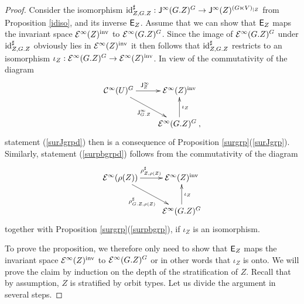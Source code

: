 \begin{proof} 
Consider the isomorphism 
$\operatorname{id}^{\sharp}_{Z,G.Z}:\mathsf{J}^\infty (G.Z)^G \rightarrow \mathsf{J}^\infty (Z)^{(G \ltimes V)_{|Z}}$ 
from Proposition \ref{idiso}, and its inverse $\mathsf{E}_Z$. Assume that we can show that                  
$\mathsf{E}_Z$ maps the invariant space $\mathcal{E}^\infty (Z)^\textup{inv}$ to $\mathcal{E}^\infty (G.Z)^G$. 
Since the image of 
$\mathcal{E}^\infty (G.Z)^G$ under $\operatorname{id}^{\sharp}_{Z,G.Z}$ obviously lies in $\mathcal{E}^\infty (Z)^\textup{inv}$
it then follows that $\operatorname{id}^{\sharp}_{Z,G.Z}$ restricts to an isomorphism 
$\iota_{Z} : \mathcal{E}^\infty (G.Z)^G \rightarrow \mathcal{E}^\infty (Z)^\textup{inv}$. 
In view of the commutativity of the diagram
\begin{eqnarray*}
 \xymatrix{\calC^\infty(U)^G\ar[r]^{\sfJ^\infty_Z\quad}\ar[dr]_{\sfJ^\infty_{G.Z}}&\calE^\infty(Z)^\textup{inv}\\
&\calE^\infty(G.Z)^G\:,\ar[u]_{\iota_{Z}}}
\end{eqnarray*}
statement (\ref{surJgrpd}) then is a consequence of Proposition \ref{surgrp}(\ref{surJgrp}).
Similarly, statement (\ref{surpbgrpd}) follows from the commutativity of the diagram
\begin{eqnarray*}
 \xymatrix{\calE^\infty(\rho(Z)) \ar[r]^{\rho^{\sharp}_{Z,\rho (Z)}}\ar[dr]_{\rho^{\sharp}_{G.Z,\rho (Z)}}&\calE^\infty(Z)^\textup{inv}\\
&\calE^\infty(G.Z)^G\ar[u]_{\iota_{Z}}}
\end{eqnarray*}
together with
Proposition \ref{surgrp}(\ref{surpbgrp}), if $\iota_Z$ is an isomorphism.

To prove the proposition, we therefore only need to show that $\mathsf{E}_Z$ maps the invariant space 
$\mathcal{E}^\infty (Z)^\textup{inv}$ to $\mathcal{E}^\infty (G.Z)^G$ or in other words that $\iota_Z$ is onto.
We will prove the claim by induction on the depth of the stratification 
of $Z$. Recall that by assumption, $Z$ is stratified by orbit types. Let us divide the argument in 
several steps.




\end{proof}
